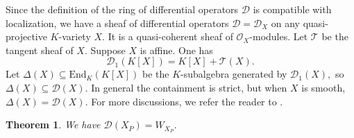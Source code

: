 \documentclass[11pt,a4paper,usenames,dvipsnames,reqno]{amsart}
\numberwithin{equation}{section}
\newtheorem{Thm}{Theorem}[section]
\theoremstyle{definition}
\theoremstyle{remark}
\begin{document}
Since the definition of the ring of differential operators $\mathcal{D}$ is compatible with localization, we have a sheaf of differential operators $\mathcal{D}=\mathcal{D}_X$ on any quasi-projective $K$-variety $X$. It is a quasi-coherent sheaf of $\mathcal{O}_X$-modules.  Let $\mathcal{T}$ be the tangent sheaf of $X.$  Suppose $X$ is affine. One has $$\mathcal{D}_1(K[X])=K[X]+\mathcal{T}(X).$$ Let $\Delta(X)\subseteq \mathrm{End}_K(K[X])$ be the $K$-subalgebra generated by $\mathcal{D}_1(X),$ so $\Delta(X)\subseteq \mathcal{D}(X)$. In general the containment is strict, but when $X$ is smooth, $\Delta(X)=\mathcal{D}(X)$. For more discussions, we refer the reader to \cite[Chapter 15]{noncomm}.




\begin{Thm}\label{thm:Weyl=Diff}
    We have $\mathcal{D}(X_P)= W_{X_P}.$
\end{Thm}
\end{document}
